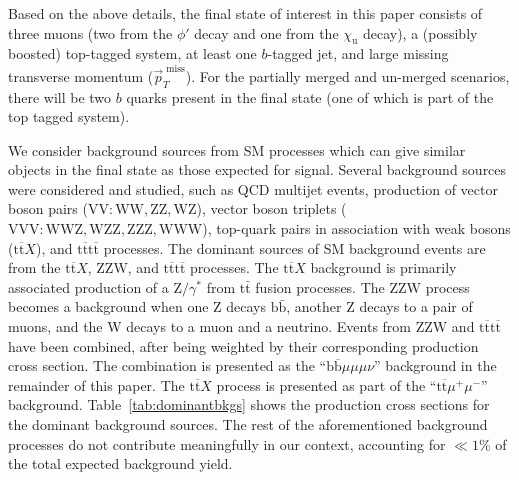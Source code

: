 Based on the above details, the final state of interest in this paper consists of three muons (two from the $\phi'$ decay and one from the $\chi_\mathrm{u}$ decay), a (possibly boosted) top-tagged system, at least one $b$-tagged jet, and large missing transverse momentum ($\vec{p}_{T}^{\textrm{~miss}}$). For the partially merged and un-merged scenarios, there will be two $b$ quarks present in the final state (one of which is part of the top tagged system). 

We consider background sources from SM processes which can give similar objects in the final state as those expected for signal. Several background sources were considered and studied, such as QCD multijet events, production of vector boson pairs ($\mathrm{VV: WW, ZZ, WZ}$), vector boson triplets ($\mathrm{VVV: WWZ, WZZ, ZZZ, WWW}$), top-quark pairs in association with weak bosons ($\mathrm{t}\overline{\mathrm{t}}X$), and $\mathrm{t}\overline{\mathrm{t}}\mathrm{t}\overline{\mathrm{t}}$ processes. The  dominant sources of SM background events are from the $\mathrm{t}\overline{\mathrm{t}}X$, $\mathrm{ZZW}$, and $\mathrm{t}\overline{\mathrm{t}}\mathrm{t}\overline{\mathrm{t}}$ processes. The $\mathrm{t}\overline{\mathrm{t}}X$ background is primarily associated production of a $\mathrm{Z}/\gamma^{*}$ from $\mathrm{t}\bar{\mathrm{t}}$ fusion processes. The $\mathrm{ZZW}$ process becomes a background when one $\mathrm{Z}$ decays $\mathrm{b}\bar{\mathrm{b}}$, another $\mathrm{Z}$ decays to a pair of muons, and the W decays to a muon and a neutrino. 
Events from $\mathrm{ZZW}$ and $\mathrm{t}\overline{\mathrm{t}}\mathrm{t}\overline{\mathrm{t}}$ have been combined, after being weighted by their corresponding production cross section. The combination is presented as the ``$\mathrm{b} \overline{\mathrm{b}}\mu\mu\mu\nu$'' background in the remainder of this paper. The $\mathrm{t}\overline{\mathrm{t}}X$ process is presented as part of the ``$\mathrm{t}\overline{\mathrm{t}}\mu^{+}\mu^{-}$'' background. Table~\ref{tab:dominantbkgs} shows the production cross sections for the dominant background sources. The rest of the aforementioned background processes do not contribute meaningfully in our context, accounting for $\ll 1\%$ of the total expected background yield.

